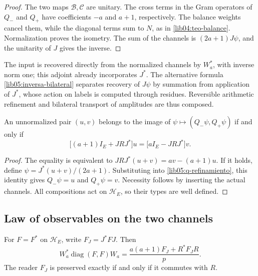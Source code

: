 \begin{proof}
The two maps \(\mathcal B,\mathcal C\) are unitary.
The cross terms in the Gram operators of \(Q_-\) and \(Q_+\) have
coefficients \(-a\) and \(a+1\), respectively. The balance
weights cancel them, while the diagonal terms sum to
\(N\), as in \cref{lib04:teo-balance}. Normalization
proves the isometry. The sum of the channels is
\((2a+1)J\psi\), and the unitarity of \(J\) gives the inverse.
\end{proof}

The input is recovered directly from the normalized channels
by \(W_a^*\), with inverse norm one; this adjoint already incorporates
\(J^*\). The alternative formula
\eqref{lib05:inversa-bilateral} separates recovery of \(J\psi\)
by summation from application of \(J^*\), whose action on labels
is computed through residues. Reversible arithmetic refinement
and bilateral transport of amplitudes are thus composed.

\begin{proposition}
\label{lib05:prop-compatibilidad}
An unnormalized pair \((u,v)\) belongs to the image of
\(\psi\mapsto(Q_-\psi,Q_+\psi)\) if and only if
\begin{equation}
 \bigl[(a+1)I_E+JRJ^*\bigr]u
 =\bigl[aI_E-JRJ^*\bigr]v.
 \label{lib05:compatibilidad}
\end{equation}
\end{proposition}

\begin{proof}
The equality is equivalent to
\(JRJ^*(u+v)=av-(a+1)u\). If it holds, define
\(\psi=J^*(u+v)/(2a+1)\). Substituting into
\eqref{lib05:q-refinamiento}, this identity gives
\(Q_-\psi=u\) and \(Q_+\psi=v\). Necessity follows by
inserting the actual channels. All compositions act
on \(\mathscr H_E\), so their types are well defined.
\end{proof}

\subsection{Law of observables on the two channels}
\label{lib05:ley-lectores}

\begin{theorem}
\label{lib05:teo-lector}
For \(F=F^*\) on \(\mathscr H_E\), write
\(F_J=J^*FJ\). Then
\begin{equation}
 W_a^*\operatorname{diag}(F,F)W_a
 =\frac{a(a+1)F_J+R^*F_JR}{p}.
 \label{lib05:lector-bilateral}
\end{equation}
The reader \(F_J\) is preserved exactly if and only if it commutes
with \(R\).
\end{theorem}

